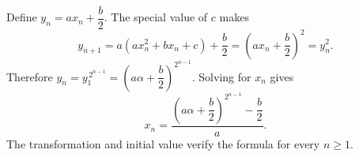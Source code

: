 Define $y_n=ax_n+\dfrac{b}{2}$. The special value of $c$ makes
\[
y_{n+1}=a(ax_n^2+bx_n+c)+\dfrac{b}{2}
=\left(ax_n+\dfrac{b}{2}\right)^2=y_n^2.
\]
Therefore $y_n=y_1^{\,2^{n-1}}=(a\alpha+\dfrac{b}{2})^{2^{n-1}}$. Solving for $x_n$ gives
\[
\boxed{x_n=\dfrac{(a\alpha+\dfrac{b}{2})^{2^{n-1}}-\dfrac{b}{2}}{a}}.
\]
The transformation and initial value verify the formula for every $n\ge1$.
